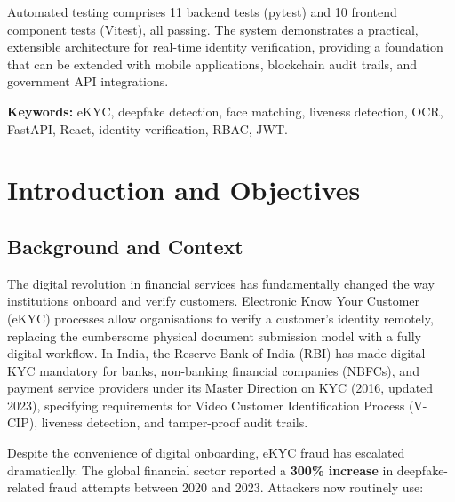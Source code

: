 \documentclass[12pt,a4paper]{report}
\begin{document}
Automated testing comprises 11 backend tests (pytest) and 10 frontend component tests (Vitest), all passing. The system demonstrates a practical, extensible architecture for real-time identity verification, providing a foundation that can be extended with mobile applications, blockchain audit trails, and government API integrations.

\textbf{Keywords:} eKYC, deepfake detection, face matching, liveness detection, OCR, FastAPI, React, identity verification, RBAC, JWT.

\newpage
\tableofcontents

\newpage
\listoffigures

\newpage
\listoftables

\chapter{Introduction and Objectives}

\section{Background and Context}

The digital revolution in financial services has fundamentally changed the way institutions onboard and verify customers. Electronic Know Your Customer (eKYC) processes allow organisations to verify a customer's identity remotely, replacing the cumbersome physical document submission model with a fully digital workflow. In India, the Reserve Bank of India (RBI) has made digital KYC mandatory for banks, non-banking financial companies (NBFCs), and payment service providers under its Master Direction on KYC (2016, updated 2023), specifying requirements for Video Customer Identification Process (V-CIP), liveness detection, and tamper-proof audit trails.

Despite the convenience of digital onboarding, eKYC fraud has escalated dramatically. The global financial sector reported a \textbf{300\% increase} in deepfake-related fraud attempts between 2020 and 2023. Attackers now routinely use:
\end{document}
